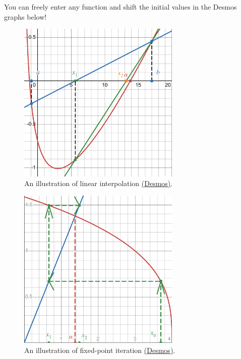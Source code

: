 \documentclass[../Notes.tex]{subfiles}
\begin{document}
    You can freely enter any function and shift the initial values in the Desmos graphs below!
    \newpage
    \begin{figure}[H]
        \centering
        \includegraphics[width=0.69\textwidth]{../Diagrams/linear-interpolation.pdf}
        \caption{An illustration of linear interpolation \href{https://www.desmos.com/calculator/yz71wfvkrl}{(Desmos)}.}
        \label{fig:linear-interpolation}
    \end{figure}
    \begin{figure}[H]
        \centering
        \includegraphics[width=0.69\textwidth]{../Diagrams/fixed-point-iteration/fixed-point-iteration-desmos.pdf}
        \caption{An illustration of fixed-point iteration \href{https://www.desmos.com/calculator/t9mnqtmhxw}{(Desmos)}.}
        \label{fig:fixed-point-iteration}
    \end{figure}
\end{document}
